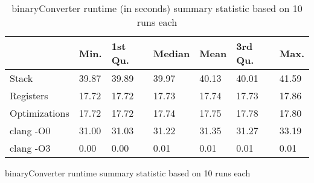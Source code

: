 \begin{table}[h!]
\centering
\begin{tabular}{p{}p{}p{}p{}p{}p{}p{}}
  \hline
 & Min. & 1st Qu. & Median & Mean & 3rd Qu. & Max. \\ 
  \hline
Stack & 39.87 & 39.89 & 39.97 & 40.13 & 40.01 & 41.59 \\ 
  Registers & 17.72 & 17.72 & 17.73 & 17.74 & 17.73 & 17.86 \\ 
  Optimizations & 17.72 & 17.72 & 17.74 & 17.75 & 17.78 & 17.80 \\ 
  clang -O0 & 31.00 & 31.03 & 31.22 & 31.35 & 31.27 & 33.19 \\ 
  clang -O3 & 0.00 & 0.00 & 0.01 & 0.01 & 0.01 & 0.01 \\ 
   \hline
\end{tabular}
\caption{binaryConverter runtime summary statistic based on 10 runs each}
\caption{binaryConverter runtime (in seconds) summary statistic based on 10 runs each}
\end{table}

